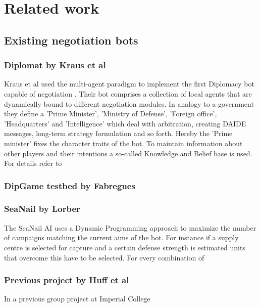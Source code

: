 \documentclass[pdftex,12pt,a4paper]{report}
\begin{document}
\section{Related work}

\subsection{Existing negotiation bots}

\subsubsection{Diplomat by Kraus et al}

Kraus et al used the multi-agent paradigm to implement the first
Diplomacy bot capable of negotiation \cite{Kraus95}. Their bot
comprises a collection of local agents that are dynamically bound to
different negotiation modules. In analogy to a government they define
a 'Prime Minister', 'Ministry of Defense', 'Foreign office',
'Headquarters' and 'Intelligence' which deal with arbitration,
creating DAIDE messages, long-term strategy formulation and so
forth. Hereby the 'Prime minister' fixes the character traits of the
bot. To maintain information about other players and their intentions
a so-called Knowledge and Belief base is used. For details refer to
\cite{Kraus88}

\subsubsection{DipGame testbed by Fabregues}

\subsubsection{SeaNail by Lorber}

The SeaNail AI \cite{Lorber98} uses a Dynamic Programming approach to
maximize the number of campaigns matching the current aims of the
bot. For instance if a supply centre is selected for capture and a
certain defense strength is estimated units that overcome this have to
be selected. For every combination of

\subsubsection{Previous project by Huff et al}

In a previous group project at Imperial College \cite{Huff05}
\end{document}
